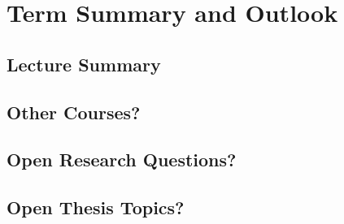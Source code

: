 \section{Term Summary and Outlook}
\subsection{Lecture Summary}
\subsection{Other Courses?}
\subsection{Open Research Questions?}
\subsection{Open Thesis Topics?}
\lessonslearned{
	\item \ldots
}{
	\item \ldots
}{
	\ldots
}

\faq{
	\item \ldots
}{
	\item \ldots
}{
	\item \ldots
}


